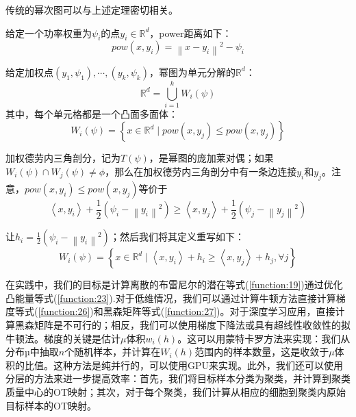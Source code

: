 传统的幂次图可以与上述定理密切相关。

\begin{definition}[power距离]\label{definition:4.1}
	给定一个功率权重为$\psi _i$的点$y_i \in \mathbb{R}^d$，power距离如下：
	\begin{equation}
		pow(x,y_i)=\left \| x-y_i \right \|^2 -\psi _i
		\label{function:28}
	\end{equation}
\end{definition}

\begin{definition}[power图]\label{definition:4.2}
	给定加权点$(y_1,\psi _1), \cdots , (y_k, \psi _k)$，幂图为单元分解的$\mathbb{R}^d$：
	\begin{equation}
		\mathbb{R}^d=\bigcup_{i=1}^{k} W_i(\psi) 
		\label{function:29}
	\end{equation}
	其中，每个单元格都是一个凸面多面体：
	\begin{equation}
		W_i(\psi)=\left \{ x \in \mathbb{R}^d \mid pow(x,y_j) \le pow(x,y_j) \right \} 
		\label{function:30}
	\end{equation}
	
	加权德劳内三角剖分，记为$T(\psi)$，是幂图的庞加莱对偶；如果$W_i(\psi)\cap W_j(\psi) \ne \phi$，那么在加权德劳内三角剖分中有一条边连接$y_i$和$y_j$。注意，$pow(x,y_i) \le pow(x,y_j)$等价于
	\begin{equation}
		\left \langle x,y_i \right \rangle +\frac{1}{2} (\psi _i -\left \| y_i \right \|^2 ) \ge \left \langle x,y_j \right \rangle + \frac{1}{2} (\psi _j -\left \| y_j \right \|^2 )
		\label{function:31}
	\end{equation}

	让$h_i=\frac{1}{2} (\psi _i - \left \| y_i \right \|^2 )$；然后我们将其定义重写如下：
	\begin{equation}
		W_i(\psi)=\left \{ x \in \mathbb{R}^d \mid \left \langle x,y_i \right \rangle +h_i \ge \left \langle x,y_j \right \rangle +h_j , \forall j \right \} 
		\label{function:32}
	\end{equation}
\end{definition}

在实践中，我们的目标是计算离散的布雷尼尔的潜在等式(\ref{function:19})通过优化凸能量等式(\ref{function:23}).对于低维情况，我们可以通过计算牛顿方法直接计算梯度等式(\ref{function:26})和黑森矩阵等式(\ref{function:27})。对于深度学习应用，直接计算黑森矩阵是不可行的；相反，我们可以使用梯度下降法或具有超线性收敛性的拟牛顿法。梯度的关键是估计$\mu$体积$w_i(h)$。这可以用蒙特卡罗方法来实现：我们从分布$µ$中抽取$n$个随机样本，并计算在$W_i(h)$范围内的样本数量，这是收敛于$\mu$体积的比值。这种方法是纯并行的，可以使用GPU来实现。此外，我们还可以使用分层的方法来进一步提高效率：首先，我们将目标样本分类为聚类，并计算到聚类质量中心的OT映射；其次，对于每个聚类，我们计算从相应的细胞到聚类内原始目标样本的OT映射。

